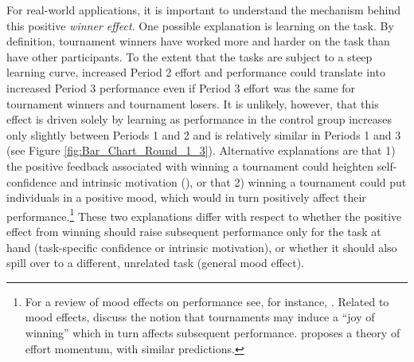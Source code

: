 For real-world applications, it is important to understand the mechanism behind this 
positive \textit{winner effect}. 
One possible explanation is learning on the task. 
By definition, tournament winners have worked more and harder on the task than have other participants. 
To the extent that the tasks are subject to a steep learning curve, 
increased 
Period 2 effort and performance could translate into increased Period 3 performance 
even if Period 3 effort was the same for tournament winners and tournament losers. 
It is unlikely, however,  that this effect is driven solely by learning as performance in the control group increases only slightly between Periods 1 and 2 and is relatively similar in Periods 1 and 3 (see Figure \ref{fig:Bar_Chart_Round_1_3}). 
Alternative explanations are that 1) the positive feedback associated with winning a tournament could heighten self-confidence and 
intrinsic motivation (\citealp{Eisenberger2003,
Vansteenkiste03}),
or that 2) winning a tournament could put 
individuals in a positive mood, which would in turn positively affect their performance.\footnote{For a review of 
mood effects on performance see, for instance, \cite{Lane2005}. Related to mood effects, 
\cite{Kraekel2008} discuss the notion that tournaments may induce a ``joy of winning'' which in turn affects subsequent performance.
\cite{DeJarnette15} proposes a theory of effort momentum, with similar predictions.} 
These two  explanations differ with respect to whether the positive effect from winning 
should raise subsequent performance only for the task at hand (task-specific confidence or intrinsic motivation), or whether 
it should also spill over to a different, unrelated task (general mood effect). 

